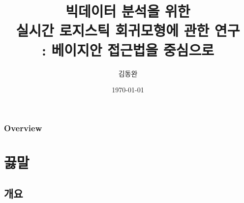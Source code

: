 \documentclass{beamer}
\title[]{빅데이터 분석을 위한 \\실시간 로지스틱 회귀모형에 관한 연구\\: 베이지안 접근법을 중심으로} %
\author{김동완} %
\institute[고려대학교 정책대학원] %
{
고려대학교 정책대학원\\ %
데이터 통계학과\\
\medskip
\textit{} %
}
\date{\today} %
\begin{document}
\begin{frame}
\titlepage %
\end{frame}

\begin{frame}
\frametitle{Overview} %
\tableofcontents %
\end{frame}




\section{끓말} %

\subsection{개요} %
\end{document}
